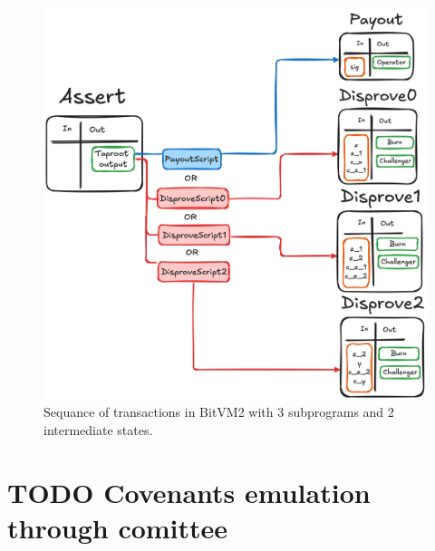 \documentclass[11pt]{article}
\begin{document}
\begin{figure}[htbp]
  \centering
  \includegraphics[width=.9\linewidth]{../images/bitvm-txs.png}
  \caption{\label{fig:bitvm-txs}Sequance of transactions in BitVM2
  with 3 subprograms and 2 intermediate states.}
\end{figure}

\section{{\bfseries\sffamily TODO} Covenants emulation through
comittee}\label{sec:covenants-emulation}

\printbibliography{}
\end{document}
